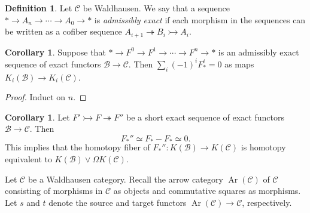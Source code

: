 \documentclass[10pt,letterpaper,cm]{nupset}
\theoremstyle{definition}
\newtheorem{definition}{Definition}
\theoremstyle{theorem}
\newtheorem{corollary}[theorem]{Corollary}
\theoremstyle{remark}
\newcommand{\1}{\mathbf{1}}
\renewcommand{\b}{\mathscr{B}}
\renewcommand{\c}{\mathscr{C}}
\newcommand{\0}{\vec 0}
\DeclareMathOperator{\Ar}{Ar}
\begin{document}
\begin{definition}
Let $\c$ be Waldhausen. We say that a sequence $\ast \to A_n \to \cdots \to A_0 \to \ast$ is \textit{admissibly exact} if each morphism in the sequences can be written as a cofiber sequence $A_{i+1} \twoheadrightarrow B_i \rightarrowtail A_i$. 
\end{definition}

\begin{corollary}
Suppose that $\ast \to F^0 \to F^1 \to \cdots \to F^n \to \ast$ is an admissibly exact sequence of exact functors $\b \to \c$. Then $\sum_i ({-}1)^iF_{\ast}^i = 0$ as maps $K_i(\b) \to K_i(\c)$.
\end{corollary}
\begin{proof}
Induct on $n$.
\end{proof}

\begin{corollary}
Let $F' \rightarrowtail F \twoheadrightarrow F''$ be a short exact sequence of exact functors $\b \to \c$. Then $$F_{\ast}'' \simeq F_{\ast} - F_{\ast} \simeq 0.$$ This implies that the homotopy fiber of $F_{\ast}'' : K(\b) \to K(\c)$ is homotopy equivalent to $K(\b) \vee \Omega K(\c)$.
\end{corollary}

\medskip

Let $\c$ be a Waldhausen category. Recall the arrow category $\Ar(\c)$ of $\c$ consisting of morphisms in $\c$ as objects and commutative squares as morphisms. Let $s$ and $t$ denote the source and target functors $\Ar(\c)\to \c$, respectively. 
\end{document}
